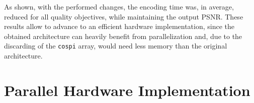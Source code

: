 As shown, with the performed changes, the encoding time was, in average, reduced for all quality objectives, while maintaining the output PSNR. These results allow to advance to an efficient hardware implementation, since the obtained architecture can heavily benefit from parallelization and, due to the discarding of the \texttt{cospi} array, would need less memory than the original architecture.

\section{Parallel Hardware Implementation}

\clearpage
\printbibliography[heading=subbibliography]
